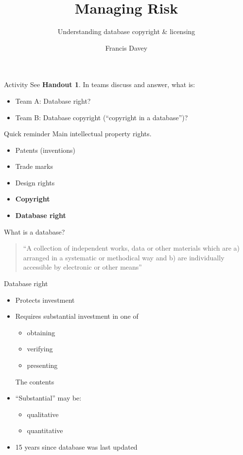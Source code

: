 \documentclass[aspectratio=169]{beamer}
\begin{document}
\title{Managing Risk}
\subtitle{Understanding database copyright \& licensing}
\author{Francis Davey}
\begin{frame}
  \titlepage
\end{frame}
\begin{frame}{Activity}
See {\bf Handout 1}. In teams discuss and answer, what is:
  \begin{itemize}
  \item Team A: Database right?
  \item Team B: Database copyright (``copyright in a database'')?
  \end{itemize}
\end{frame}

\begin{frame}{Quick reminder}
Main intellectual property rights.
\begin{itemize}
\item Patents (inventions)
\item Trade marks 
\item Design rights
\item {\bf Copyright}
\item {\bf Database right}
\end{itemize}
\end{frame}

\begin{frame}{What is a database?}
  \begin{quote}
    ``A collection of independent works, data or other materials which are 
    a) arranged in a systematic or methodical way and 
    b) are individually accessible by electronic or other means''
  \end{quote}
\end{frame}

\begin{frame}{Database right}
  \begin{itemize}
  \item Protects investment
  \item Requires substantial investment in one of
    \begin{itemize}
    \item obtaining
    \item verifying
    \item presenting
    \end{itemize}
The contents
\item ``Substantial'' may be:
  \begin{itemize}
  \item qualitative
  \item quantitative
  \end{itemize}
\item 15 years since database was last updated
  \end{itemize}
\end{frame}
\end{document}
